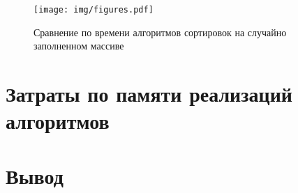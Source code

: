\begin{figure}[H]
	\centering
	\texttt{[image: img/figures.pdf]}
	\caption{Сравнение по времени алгоритмов сортировок на случайно заполненном массиве}
	\label{plt:time_03}
\end{figure}

\section{Затраты по памяти реализаций алгоритмов}

\section*{Вывод}
